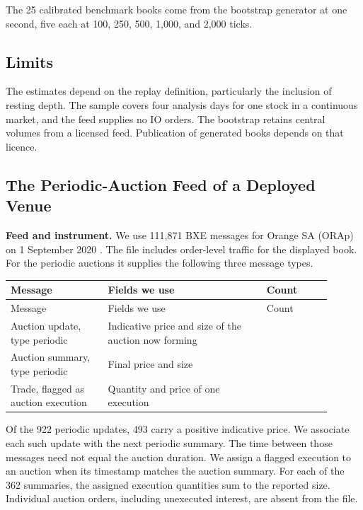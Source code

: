 The 25 calibrated benchmark books come from the bootstrap generator at one second, five each at 100, 250, 500, 1,000, and 2,000 ticks.

\subsection{Limits}

The estimates depend on the replay definition, particularly the inclusion of resting depth. The sample covers four analysis days for one stock in a continuous market, and the feed supplies no IO orders. The bootstrap retains central volumes from a licensed feed. Publication of generated books depends on that licence.

\subsection{The Periodic-Auction Feed of a Deployed Venue}

\textbf{Feed and instrument.} We use 111,871 BXE messages for Orange SA (ORAp) on 1 September 2020 \cite{cboepitch}. The file includes order-level traffic for the displayed book. For the periodic auctions it supplies the following three message types.

\begingroup
\setlength{\tabcolsep}{2pt}\small
\begin{longtable}{@{}>{\raggedright\arraybackslash}p{0.2790\linewidth}>{\raggedright\arraybackslash}p{0.4410\linewidth}>{\raggedright\arraybackslash}p{0.1800\linewidth}@{}}
\toprule
Message & Fields we use & Count \\
\midrule\endfirsthead
\toprule
Message & Fields we use & Count \\
\midrule\endhead
\bottomrule\endfoot
Auction update, type periodic & Indicative price and size of the auction now forming & 922 \\
Auction summary, type periodic & Final price and size & 362 \\
Trade, flagged as auction execution & Quantity and price of one execution & 400 \\
\end{longtable}
\endgroup

Of the 922 periodic updates, 493 carry a positive indicative price. We associate each such update with the next periodic summary. The time between those messages need not equal the auction duration. We assign a flagged execution to an auction when its timestamp matches the auction summary. For each of the 362 summaries, the assigned execution quantities sum to the reported size. Individual auction orders, including unexecuted interest, are absent from the file.

